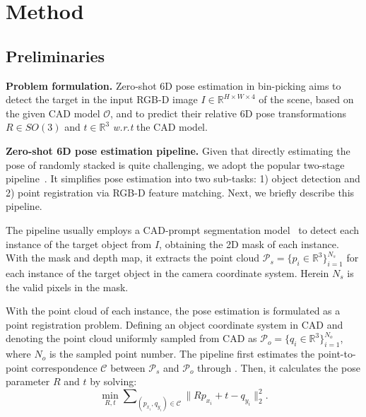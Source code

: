 \section{Method}
\subsection{Preliminaries}
\noindent\textbf{Problem formulation.}
Zero-shot 6D pose estimation in bin-picking aims to detect the target  in the input RGB-D image $I\! \in\! \mathbb{R}^{H \times W \times 4}$ of the scene, based on the given CAD model $\mathcal{O}$, and to predict their relative 6D pose transformations $R \in SO(3)$ and $t \in \mathbb{R}^3$ \emph{w.r.t} the CAD model.



\vspace{1mm}
\noindent\textbf{Zero-shot 6D pose estimation pipeline.} Given that directly estimating the pose of randomly stacked  is quite challenging, we adopt the popular two-stage pipeline~\cite{chen2023zeropose, sam6d, FoundationPose, nguyen2024gigapose}. It simplifies pose estimation into two sub-tasks: 1) object detection and 2) point registration via RGB-D feature matching. Next, we briefly describe this pipeline.

The pipeline usually employs a CAD-prompt segmentation model~\cite{chen2023zeropose, sam6d} to detect each instance of the target object from $I$, obtaining the 2D mask of each instance. With the mask and depth map, it extracts the point cloud $\mathcal{P}_s = \{p_i \in \mathbb{R}^3\}_{i=1}^{N_s}$ for each instance of the target object in the camera coordinate system. Herein $N_s$ is the valid pixels in the mask. 

With the point cloud of each instance, the pose estimation is formulated as a point registration problem. Defining an object coordinate system in CAD and denoting the point cloud uniformly sampled from CAD as $\mathcal{P}_o = \{q_i \in \mathbb{R}^3\}_{i=1}^{N_o}$, where $N_o$ is the sampled point number. The pipeline first estimates the point-to-point correspondence $\mathcal{C}$ between $\mathcal{P}_s$ and $\mathcal{P}_o$ through . Then, it calculates the pose parameter $R$ and $t$ by solving: 
\begin{equation}
\label{equ:solve_pose}
\min_{R, t} \sum\nolimits_{({p}_{x_i}, {q}_{y_i}) \in \mathcal{C}} \lVert R {p}_{x_i} + t - {q}_{y_i} \rVert^2_2.
\end{equation}

